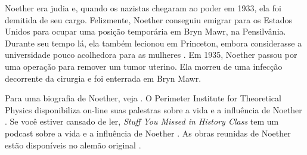 \documentclass[../../../include/open-logic-section]{subfiles}
\begin{document}
Noether era judia e, quando os nazistas chegaram ao poder em 1933, ela foi
demitida de seu cargo. Felizmente, Noether conseguiu emigrar para os
Estados Unidos para ocupar uma posição temporária em Bryn Mawr, na
Pensilvânia. Durante seu tempo lá, ela também lecionou em Princeton,
embora considerasse a universidade pouco acolhedora para as mulheres
\citep[81]{Dick1981}. Em 1935, Noether passou por uma operação para
remover um tumor uterino. Ela morreu de uma infecção decorrente da
cirurgia e foi enterrada em Bryn Mawr.

\begin{reading} 
Para uma biografia de Noether, veja \citet{Dick1981}. O Perimeter
Institute for Theoretical Physics disponibiliza on-line suas palestras sobre a
vida e a influência de Noether \citep{Perimeter2015}. Se você estiver cansado
de ler, \emph{Stuff You Missed in History Class} tem um podcast sobre a
vida e a influência de Noether \citep{Frey2015}. As obras reunidas de
Noether estão disponíveis no alemão original \citep{Noether1983}.
\end{reading}
\end{document}
